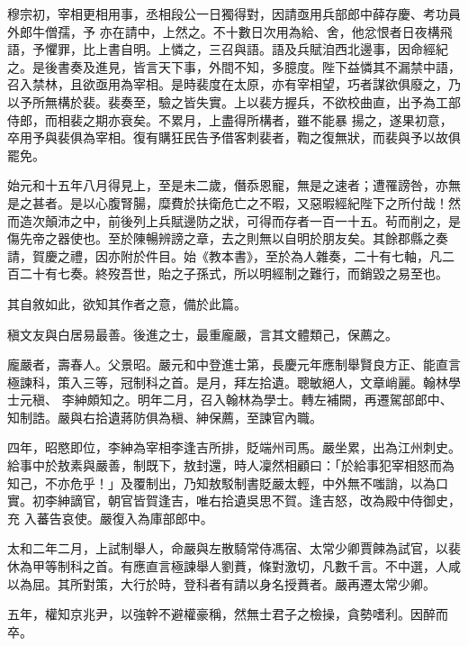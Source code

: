 \begin{pinyinscope}
 穆宗初，宰相更相用事，丞相段公一日獨得對，因請亟用兵部郎中薛存慶、考功員外郎牛僧孺，予
 亦在請中，上然之。不十數日次用為給、舍，他忿恨者日夜構飛語，予懼罪，比上書自明。上憐之，三召與語。語及兵賦洎西北邊事，因命經紀之。是後書奏及進見，皆言天下事，外間不知，多臆度。陛下益憐其不漏禁中語，召入禁林，且欲亟用為宰相。是時裴度在太原，亦有宰相望，巧者謀欲俱廢之，乃以予所無構於裴。裴奏至，驗之皆失實。上以裴方握兵，不欲校曲直，出予為工部侍郎，而相裴之期亦衰矣。不累月，上盡得所構者，雖不能暴
 揚之，遂果初意，卒用予與裴俱為宰相。復有購狂民告予借客刺裴者，鞫之復無狀，而裴與予以故俱罷免。



 始元和十五年八月得見上，至是未二歲，僭忝恩寵，無是之速者；遭罹謗咎，亦無是之甚者。是以心腹腎腸，糜費於扶衛危亡之不暇，又惡暇經紀陛下之所付哉！然而造次顛沛之中，前後列上兵賦邊防之狀，可得而存者一百一十五。茍而削之，是傷先帝之器使也。至於陳暢辨謗之章，去之則無以自明於朋友矣。其餘郡縣之奏
 請，賀慶之禮，因亦附於件目。始《教本書》，至於為人雜奏，二十有七軸，凡二百二十有七奏。終歿吾世，貽之子孫式，所以明經制之難行，而銷毀之易至也。



 其自敘如此，欲知其作者之意，備於此篇。



 稹文友與白居易最善。後進之士，最重龐嚴，言其文體類己，保薦之。



 龐嚴者，壽春人。父景昭。嚴元和中登進士第，長慶元年應制舉賢良方正、能直言極諫科，策入三等，冠制科之首。是月，拜左拾遺。聰敏絕人，文章峭麗。翰林學士元稹、
 李紳頗知之。明年二月，召入翰林為學士。轉左補闕，再遷駕部郎中、知制誥。嚴與右拾遺蔣防俱為稹、紳保薦，至諫官內職。



 四年，昭愍即位，李紳為宰相李逢吉所排，貶端州司馬。嚴坐累，出為江州刺史。給事中於敖素與嚴善，制既下，敖封還，時人凜然相顧曰：「於給事犯宰相怒而為知己，不亦危乎！」及覆制出，乃知敖駁制書貶嚴太輕，中外無不嗤誚，以為口實。初李紳謫官，朝官皆賀逢吉，唯右拾遺吳思不賀。逢吉怒，改為殿中侍御史，充
 入蕃告哀使。嚴復入為庫部郎中。



 太和二年二月，上試制舉人，命嚴與左散騎常侍馮宿、太常少卿賈餗為試官，以裴休為甲等制科之首。有應直言極諫舉人劉蕡，條對激切，凡數千言。不中選，人咸以為屈。其所對策，大行於時，登科者有請以身名授蕡者。嚴再遷太常少卿。



 五年，權知京兆尹，以強幹不避權豪稱，然無士君子之檢操，貪勢嗜利。因醉而卒。




\end{pinyinscope}
